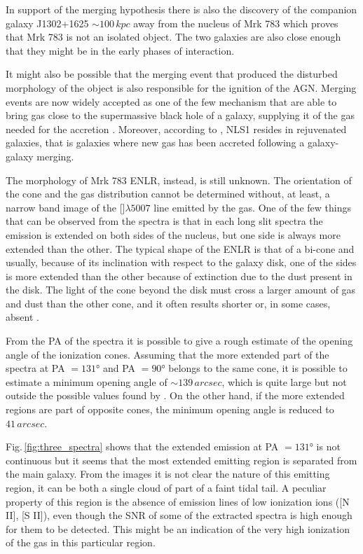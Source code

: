\documentclass[../main.tex]{subfiles}
\begin{document}
In support of the merging hypothesis there is also the discovery of the companion galaxy J1302+1625 $\sim100\,\si{kpc}$ away from the nucleus of Mrk 783 which proves that Mrk 783 is not an isolated object.
The two galaxies are also close enough that they might be in the early phases of interaction.

It might also be possible that the merging event that produced the disturbed morphology of the object is also responsible for the ignition of the AGN.
Merging events are now widely accepted as one of the few mechanism that are able to bring gas close to the supermassive black hole of a galaxy, supplying it of the gas needed for the accretion \citep{Sanders88,Hong15}.
Moreover, according to \citet{Mathur00}, NLS1 resides in rejuvenated galaxies, that is galaxies where new gas has been accreted following a galaxy-galaxy merging.

The morphology of Mrk 783 ENLR, instead, is still unknown.
The orientation of the cone and the gas distribution cannot be determined without, at least, a narrow band image of the []$\lambda5007$ line emitted by the gas.
One of the few things that can be observed from the spectra is that in each long slit spectra the emission is extended on both sides of the nucleus, but one side is always more extended than the other.
The typical shape of the ENLR is that of a bi-cone \citep{Pogge88,Schmitt94,Fischer13} and usually, because of its inclination with respect to the galaxy disk, one of the sides is more extended than the other because of extinction due to the dust present in the disk.
The light of the cone beyond the disk must cross a larger amount of gas and dust than the other cone, and it often results shorter \citep[e.g. NGC 5643,][]{Simpson97} or, in some cases, absent \citep{Wilson96}.

From the PA of the spectra it is possible to give a rough estimate of the opening angle of the ionization cones.
Assuming that the more extended part of the spectra at PA $=\ang{131}$ and PA $=\ang{90}$ belongs to the same cone, it is possible to estimate a minimum opening angle of $\sim 139\,\si{arcsec}$, which is quite large but not outside the possible values found by \citet{He18}.
On the other hand, if the more extended regions are part of opposite cones, the minimum opening angle is reduced to $41\,\si{arcsec}$.

Fig.\,\ref{fig:three_spectra} shows that the extended emission at PA $=\ang{131}$ is not continuous but it seems that the most extended emitting region is separated from the main galaxy.
From the images it is not clear the nature of this emitting region, it can be both a single cloud of part of a faint tidal tail.
A peculiar property of this region is the absence of emission lines of low ionization ions ([N II], [S II]), even though the SNR of some of the extracted spectra is high enough for them to be detected.
This might be an indication of the very high ionization of the gas in this particular region.
\end{document}
